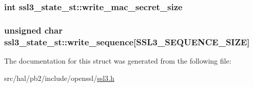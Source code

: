\subsubsection[{\texorpdfstring{write\+\_\+mac\+\_\+secret\+\_\+size}{write_mac_secret_size}}]{\setlength{\rightskip}{0pt plus 5cm}int ssl3\+\_\+state\+\_\+st\+::write\+\_\+mac\+\_\+secret\+\_\+size}\hypertarget{structssl3__state__st_a916b1cd43d422b48e52b779e79432b5c}{}\label{structssl3__state__st_a916b1cd43d422b48e52b779e79432b5c}
\subsubsection[{\texorpdfstring{write\+\_\+sequence}{write_sequence}}]{\setlength{\rightskip}{0pt plus 5cm}unsigned char ssl3\+\_\+state\+\_\+st\+::write\+\_\+sequence\mbox{[}{\bf S\+S\+L3\+\_\+\+S\+E\+Q\+U\+E\+N\+C\+E\+\_\+\+S\+I\+ZE}\mbox{]}}\hypertarget{structssl3__state__st_a905c2e9c2e534832459c81374bc0eb34}{}\label{structssl3__state__st_a905c2e9c2e534832459c81374bc0eb34}


The documentation for this struct was generated from the following file\+:\begin{DoxyCompactItemize}
\item 
src/hal/pb2/include/openssl/\hyperlink{ssl3_8h}{ssl3.\+h}\end{DoxyCompactItemize}
